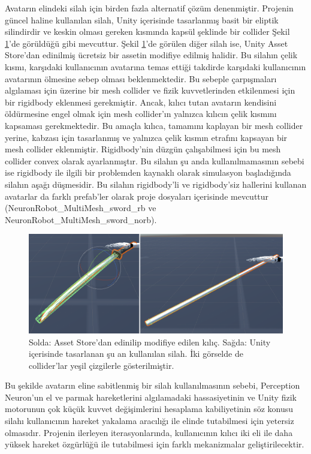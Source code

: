 \documentclass[a4paper, 12pt, titlepage]{article}
\begin{document}
Avatarın elindeki silah için birden fazla alternatif çözüm denenmiştir. Projenin güncel haline
kullanılan silah, Unity içerisinde tasarlanmış basit bir eliptik silindirdir ve keskin olması
gereken kısmında kapsül şeklinde bir collider Şekil \ref{s}’de görüldüğü gibi mevcuttur. Şekil
\ref{s}’de görülen diğer silah ise, Unity Asset Store’dan edinilmiş ücretsiz bir assetin modifiye
edilmiş halidir. Bu silahın çelik kısmı, karşıdaki kullanıcının avatarına temas ettiği takdirde
karşıdaki kullanıcının avatarının ölmesine sebep olması beklenmektedir. Bu sebeple çarpışmaları
algılaması için üzerine bir mesh collider ve fizik kuvvetlerinden etkilenmesi için bir rigidbody
eklenmesi gerekmiştir. Ancak, kılıcı tutan avatarın kendisini öldürmesine engel olmak için mesh
collider’ın yalnızca kılıcın çelik kısmını kapsaması gerekmektedir. Bu amaçla kılıca, tamamını
kaplayan bir mesh collider yerine, kabzası için tasarlanmış ve yalnızca çelik kısmın etrafını
kapsayan bir mesh collider eklenmiştir. Rigidbody’nin düzgün çalışabilmesi için bu mesh collider
convex olarak ayarlanmıştır. Bu silahın şu anda kullanılmamasının sebebi ise rigidbody ile ilgili
bir problemden kaynaklı olarak simulasyon başladığında silahın aşağı düşmesidir. Bu silahın
rigidbody’li ve rigidbody’siz hallerini kullanan avatarlar da farklı prefab’ler olarak proje
dosyaları içerisinde mevcuttur (NeuronRobot\_MultiMesh\_sword\_rb ve
NeuronRobot\_MultiMesh\_sword\_norb).

\begin{figure}
    \centering
        \includegraphics[width=6in]{images/s}
    \caption{Solda: Asset Store'dan edinilip modifiye edilen kılıç. Sağda: Unity içerisinde
             tasarlanan şu an kullanılan silah. İki görselde de collider'lar yeşil çizgilerle
             gösterilmiştir.}
    \label{s}
\end{figure}

Bu şekilde avatarın eline sabitlenmiş bir silah kullanılmasının sebebi, Perception Neuron’un el ve
parmak hareketlerini algılamadaki hassasiyetinin ve Unity fizik motorunun çok küçük kuvvet
değişimlerini hesaplama kabiliyetinin söz konusu silahı kullanıcının hareket yakalama aracılığı ile
elinde tutabilmesi için yetersiz olmasıdır. Projenin ilerleyen iterasyonlarında, kullanıcının
kılıcı iki eli ile daha yüksek hareket özgürlüğü ile tutabilmesi için farklı mekanizmalar
geliştirilecektir.
\end{document}
